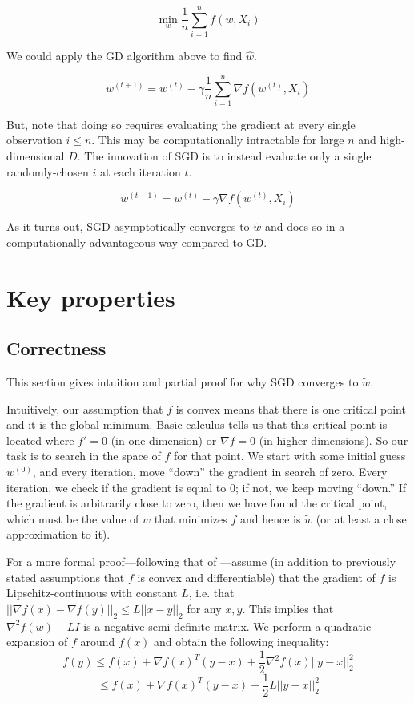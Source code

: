 \documentclass{report}
\begin{document}
\begin{equation}
	\min_w  \frac{1}{n} \sum_{i=1}^n f(w, X_i)
\end{equation}

We could apply the GD algorithm above to find $\hat{w}$.

\begin{equation}
	w^{(t+1)} = w^{(t)} - \gamma \frac{1}{n} \sum_{i=1}^n \nabla f(w^{(t)},
	X_i)
\end{equation}

But, note that doing so requires evaluating the gradient at every single
observation $i \leq n$. This may be computationally intractable for large $n$
and high-dimensional $D$. The innovation of SGD is to instead evaluate only a
single randomly-chosen $i$ at each iteration $t$.

\begin{equation}
	w^{(t+1)} = w^{(t)} - \gamma \nabla f(w^{(t)}, X_i)
\end{equation}

As it turns out, SGD asymptotically converges to $\tilde{w}$ and does so in a computationally
advantageous way compared to GD.

\section{Key properties}

\subsection{Correctness}

This section gives intuition and partial proof for why SGD converges to
$\tilde{w}$.

Intuitively, our assumption that $f$ is convex means that there is one critical
point and it is the global minimum. Basic calculus tells us that this critical
point is located where $f'=0$ (in one dimension) or $\nabla f = 0$ (in higher
dimensions). So our task is to search in the space of $f$ for that point. We
start with some initial guess $w^{(0)}$, and every iteration, move ``down'' the
gradient in search of zero. Every iteration, we check if the gradient is equal
to 0; if not, we keep moving ``down.'' If the gradient is arbitrarily close to
zero, then we have found the critical point, which must be the value of $w$ that
minimizes $f$ and hence is $\tilde{w}$ (or at least a close approximation to it).

For a more formal proof---following that of \cite{tibs_notes}---assume (in addition to previously stated assumptions
that $f$ is convex and differentiable) that the gradient of $f$ is Lipschitz-continuous
with constant $L$, i.e. that $||\nabla f(x) - \nabla f(y)||_2 \leq L||x-y||_2$
for any $x, y$. This implies that $\nabla^2 f(w) - LI$ is a negative
semi-definite matrix. We perform a quadratic expansion of $f$ around $f(x)$ and
obtain the following inequality:
$$
f(y) \leq f(x) + \nabla f(x)^T(y-x) + \frac{1}{2}\nabla^2 f(x)||y-x||_2^2
$$
\begin{equation}
	\leq f(x) + \nabla f(x)^T(y-x) + \frac{1}{2}L||y-x||_2^2
\end{equation}
\end{document}
